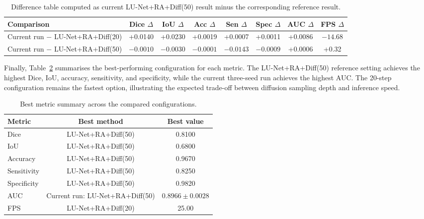 \documentclass[journal,article,submit,pdftex,moreauthors]{Definitions/mdpi}
\begin{document}
\begin{table}[H]
\centering
\caption{Difference table computed as current LU-Net+RA+Diff(50) result minus the corresponding reference result.}
\label{tab:difference_current_reference}
\small
\begin{adjustbox}{width=\textwidth}
\begin{tabular}{lccccccc}
\toprule
Comparison & Dice $\Delta$ & IoU $\Delta$ & Acc $\Delta$ & Sen $\Delta$ & Spec $\Delta$ & AUC $\Delta$ & FPS $\Delta$ \\
\midrule
Current run $-$ LU-Net+RA+Diff(20) 
& +0.0140 & +0.0230 & +0.0019 & +0.0007 & +0.0011 & +0.0086 & $-14.68$ \\

Current run $-$ LU-Net+RA+Diff(50) 
& $-0.0010$ & $-0.0030$ & $-0.0001$ & $-0.0143$ & $-0.0009$ & +0.0006 & +0.32 \\
\bottomrule
\end{tabular}
\end{adjustbox}
\end{table}

Finally, Table~\ref{tab:best_metric_summary} summarises the best-performing configuration for each metric. The LU-Net+RA+Diff(50) reference setting achieves the highest Dice, IoU, accuracy, sensitivity, and specificity, while the current three-seed run achieves the highest AUC. The 20-step configuration remains the fastest option, illustrating the expected trade-off between diffusion sampling depth and inference speed.

\begin{table}[H]
\centering
\caption{Best metric summary across the compared configurations.}
\label{tab:best_metric_summary}
\small
\begin{tabular}{lcc}
\toprule
Metric & Best method & Best value \\
\midrule
Dice & LU-Net+RA+Diff(50) & 0.8100 \\
IoU & LU-Net+RA+Diff(50) & 0.6800 \\
Accuracy & LU-Net+RA+Diff(50) & 0.9670 \\
Sensitivity & LU-Net+RA+Diff(50) & 0.8250 \\
Specificity & LU-Net+RA+Diff(50) & 0.9820 \\
AUC & Current run: LU-Net+RA+Diff(50) & $0.8966 \pm 0.0028$ \\
FPS & LU-Net+RA+Diff(20) & 25.00 \\
\bottomrule
\end{tabular}
\end{table}
\end{document}

